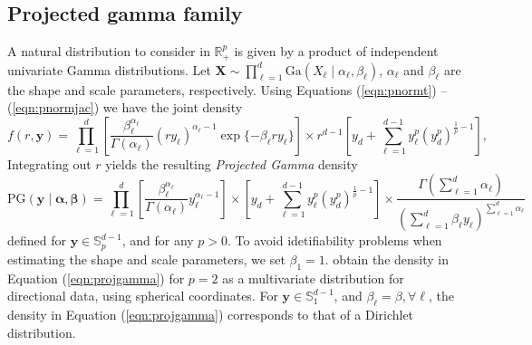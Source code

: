 \subsection{Projected gamma family\label{subsec:projgamma}}
  A natural  distribution to consider in ${\mathbb R}^p_+$ is given by a product of independent
  univariate Gamma distributions. Let
    $\bm{ X} \sim \prod_{\ell = 1}^d\text{Ga}\left(X_{\ell}\mid\alpha_{\ell},\beta_{\ell}\right)$, 
    $\alpha_\ell$ and $\beta_\ell$ are the shape and scale parameters, respectively. Using Equations (\ref{eqn:pnormt}) -- (\ref{eqn:pnormjac}) we have the joint density
  \begin{equation*}
    f(r,\bm{ y}) = \prod_{\ell = 1}^{d}
      \left[\frac{\beta_{\ell}^{\alpha_{\ell}}}{\Gamma(\alpha_{\ell})}(ry_{\ell})^{\alpha_{\ell} - 1}
          \exp\lbrace-\beta_{\ell}ry_{\ell}\rbrace\right]
      \times r^{d-1}\left[y_d +
            {\textstyle \sum}_{\ell = 1}^{d-1}y_{\ell}^p\left(y_d^p\right)^{\frac{1}{p} - 1}\right],
  \end{equation*}
  Integrating out $r$ yields the resulting \emph{Projected Gamma} density
  \begin{equation}
    \label{eqn:projgamma}
    \text{PG}(\bm{ y}\mid\bm{ \alpha},\bm{ \beta}) =
          \prod_{\ell = 1}^d\left[\frac{\beta_{\ell}^{\alpha_{\ell}}}{\Gamma(\alpha_{\ell})}
                y_{\ell}^{\alpha_{\ell} - 1}\right]
      \times \left[y_d +
          {\textstyle \sum}_{\ell = 1}^{d-1}y_{\ell}^p\left(y_d^p\right)^{\frac{1}{p} - 1}\right]
      \times \frac{\Gamma({\textstyle\sum}_{\ell = 1}^d\alpha_{\ell})}{\left({\textstyle\sum}_{\ell = 1}^d
                    \beta_{\ell}y_{\ell}\right)^{{\scriptstyle\sum_{\ell = 1}^d \alpha_{\ell}}}}
  \end{equation}
  defined for $\bm{y}\in {\mathbb S}_p^{d-1}$, and for any $p>0$. To avoid idetifiability problems when estimating the shape and scale parameters, we set $\beta_1 = 1$.
  \cite{nunez2019} obtain the density in Equation (\ref{eqn:projgamma})
  for $p=2$ as a multivariate distribution for directional data, using spherical coordinates.
  For $\bm{ y}\in {\mathbb S}_1^{d-1}$, and $\beta_{\ell} = \beta, \forall\ell$, the density in Equation (\ref{eqn:projgamma}) corresponds to that of a Dirichlet distribution.
  

